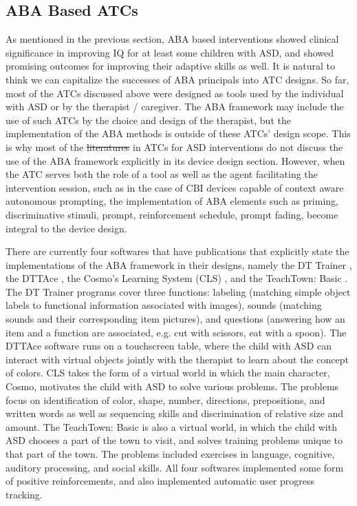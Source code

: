 \documentclass{ut-thesis}
\providecommand{\DIFaddtex}[1]{{\protect\color{blue}\uwave{#1}}} %
\providecommand{\DIFdeltex}[1]{{\protect\color{red}\sout{#1}}}                      %
\providecommand{\DIFaddbegin}{} %
\providecommand{\DIFaddend}{} %
\providecommand{\DIFdelbegin}{} %
\providecommand{\DIFdelend}{} %
\providecommand{\DIFadd}[1]{\texorpdfstring{\DIFaddtex{#1}}{#1}} %
\providecommand{\DIFdel}[1]{\texorpdfstring{\DIFdeltex{#1}}{}} %
\begin{document}
\subsection{ABA Based ATCs}
As mentioned in the previous section, ABA based interventions showed clinical significance in improving IQ for at least some children with ASD, and showed promising outcomes for improving their adaptive skills as well.  It is natural to think we can capitalize the successes of ABA principals into ATC designs.  So far, most of the ATCs discussed above were designed as tools used by the individual with ASD or by the therapist / caregiver.  The ABA framework may include the use of such ATCs by the choice and design of the therapist, but the implementation of the ABA methods is outside of these ATCs' design scope.  This is why most of the \DIFdelbegin \DIFdel{literatures }\DIFdelend \DIFaddbegin \DIFadd{literature }\DIFaddend in ATCs for ASD interventions do not discuss the use of the ABA framework explicitly in its device design section.  However, when the ATC serves both the role of a tool as well as the agent facilitating the intervention session, such as in the case of CBI devices capable of context aware autonomous prompting, the implementation of ABA elements such as priming, discriminative stimuli, prompt, reinforcement schedule, prompt fading, become integral to the device design.

There are currently four softwares that have publications that explicitly state the implementations of the ABA framework in their designs, namely the DT Trainer \cite{ashton2001applications}, the DTTAce \cite{picardo2014towards}, the Cosmo's Learning System (CLS) \cite{lathan2007using}, and the TeachTown: Basic \cite{whalen2010efficacy}.  The DT Trainer programs cover three functions: labeling (matching simple object labels to functional information associated with images), sounds (matching sounds and their corresponding item pictures), and questions (answering how an item and a function are associated, e.g. cut with scissors, eat with a spoon).  The DTTAce software runs on a touchscreen table, where the child with ASD can interact with virtual objects jointly with the therapist to learn about the concept of colors.  CLS takes the form of a virtual world in which the main character, Cosmo, motivates the child with ASD to solve various problems.  The problems focus on identification of color, shape, number, directions, prepositions, and written words as well as sequencing skills and discrimination of relative size and amount.  The TeachTown: Basic is also a virtual world, in which the child with ASD chooses a part of the town to visit, and solves training problems unique to that part of the town.  The problems included exercises in language, cognitive, auditory processing, and social skills.  All four softwares implemented some form of positive reinforcements, and also implemented automatic user progress tracking.
\end{document}
